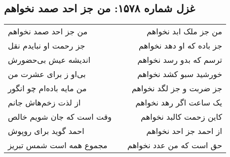 \begin{center}
\section*{غزل شماره ۱۵۷۸: من جز احد صمد نخواهم}
\label{sec:1578}
\begin{longtable}{l p{0.5cm} r}
من جز احد صمد نخواهم
&&
من جز ملک ابد نخواهم
\\
جز رحمت او نبایدم نقل
&&
جز باده که او دهد نخواهم
\\
اندیشه عیش بی‌حضورش
&&
ترسم که بدو رسد نخواهم
\\
بی‌او ز برای عشرت من
&&
خورشید سبو کشد نخواهم
\\
من مایه باده‌ام چو انگور
&&
جز ضربت و جز لگد نخواهم
\\
از لذت زخم‌هاش جانم
&&
یک ساعت اگر رهد نخواهم
\\
وقت است که جان شویم خالص
&&
کاین زحمت کالبد نخواهم
\\
احمد گوید برای روپوش
&&
از احمد جز احد نخواهم
\\
مجموع همه است شمس تبریز
&&
حق است که من عدد نخواهم
\\
\end{longtable}
\end{center}
